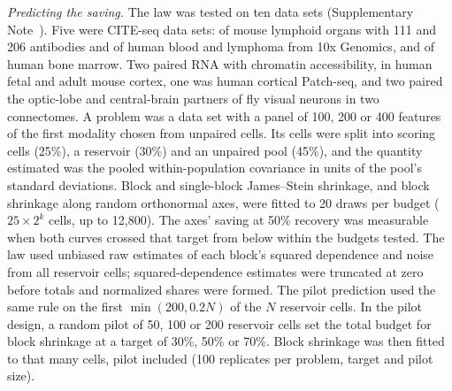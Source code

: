 \documentclass[pdflatex,sn-vancouver-num,iicol]{sn-jnl}
\begin{document}
\textit{Predicting the saving.} The law was tested on ten data sets (Supplementary Note~). Five were CITE-seq data sets: of mouse lymphoid organs with 111 and 206 antibodies and of human blood and lymphoma from 10x Genomics\cite{totalvi2021}, and of human bone marrow\cite{stuart2019}. Two paired RNA with chromatin accessibility, in human fetal and adult mouse cortex\cite{trevino2021,chen2019snare}, one was human cortical Patch-seq\cite{lee2023gaba}, and two paired the optic-lobe and central-brain partners of fly visual neurons in two connectomes\cite{dorkenwald2024,bates2026}. A problem was a data set with a panel of 100, 200 or 400 features of the first modality chosen from unpaired cells. Its cells were split into scoring cells (25\%), a reservoir (30\%) and an unpaired pool (45\%), and the quantity estimated was the pooled within-population covariance in units of the pool's standard deviations. Block and single-block James--Stein shrinkage, and block shrinkage along random orthonormal axes, were fitted to 20 draws per budget ($25\times2^k$ cells, up to 12,800). The axes' saving at 50\% recovery was measurable when both curves crossed that target from below within the budgets tested. The law used unbiased raw estimates of each block's squared dependence and noise from all reservoir cells; squared-dependence estimates were truncated at zero before totals and normalized shares were formed. The pilot prediction used the same rule on the first $\min(200,0.2N)$ of the $N$ reservoir cells. In the pilot design, a random pilot of 50, 100 or 200 reservoir cells set the total budget for block shrinkage at a target of 30\%, 50\% or 70\%. Block shrinkage was then fitted to that many cells, pilot included (100 replicates per problem, target and pilot size).
\end{document}
